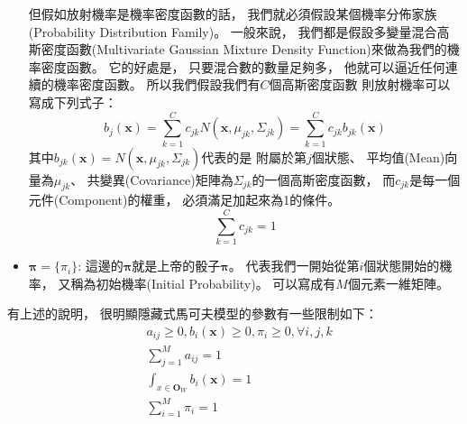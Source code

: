 \begin{itemize}
	但假如放射機率是機率密度函數的話，
	我們就必須假設某個機率分佈家族(Probability Distribution Family)。
	一般來說，
	我們都是假設多變量混合高斯密度函數(Multivariate Gaussian Mixture Density Function)來做為我們的機率密度函數。
	它的好處是，
	只要混合數的數量足夠多，
	他就可以逼近任何連續的機率密度函數。
	所以我們假設我們有$C$個高斯密度函數
	則放射機率可以寫成下列式子：
	\begin{equation}
	  b_j(\mathbf{x}) = \sum_{k=1}^C c_{jk} N(\mathbf{x}, \mu_{jk}, \Sigma_{jk}) = \sum_{k=1}^C c_{jk} b_{jk}(\mathbf{x}) 
	\end{equation}
	其中$b_{jk}(\mathbf{x}) = N(\mathbf{x}, \mu_{jk}, \Sigma_{jk})$代表的是
	附屬於第$j$個狀態、
	平均值(Mean)向量為$\mu_{jk}$、
	共變異(Covariance)矩陣為$\Sigma_{jk}$的一個高斯密度函數，
	而$c_{jk}$是每一個元件(Component)的權重，
	必須滿足加起來為1的條件。
	\begin{equation}
	  \sum_{k=1}^C c_{jk} = 1
	\end{equation}

      \item $\mathbf{\pi} = \lbrace \pi_i \rbrace$:
	這邊的$\mathbf{\pi}$就是上帝的骰子$\mathbf{\pi}$。
	代表我們一開始從第$i$個狀態開始的機率，
	又稱為初始機率(Initial Probability)。
	可以寫成有$M$個元素一維矩陣。
    \end{itemize}

    有上述的說明，
    很明顯隱藏式馬可夫模型的參數有一些限制如下：
    \begin{align}
      &a_{ij} \geq 0, b_i(\mathbf{x}) \geq 0, \pi_i \geq 0, \forall i, j, k \\
      &\sum_{j=1}^M a_{ij} = 1	\\
      &\int_{x \in \mathbf{O}_W} b_i(\mathbf{x}) = 1 \\
      &\sum_{i=1}^M \pi_i = 1 
    \end{align}

